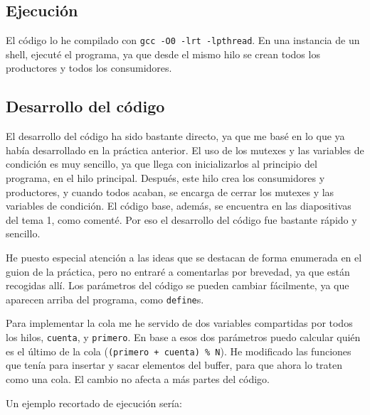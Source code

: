 \documentclass[a4paper]{article}
\begin{document}
\subsection{Ejecución}

El código lo he compilado con \texttt{gcc -O0 -lrt -lpthread}. En una instancia de un shell, ejecuté el programa, ya que desde el mismo hilo se crean todos los productores y todos los consumidores.

\subsection{Desarrollo del código}

El desarrollo del código ha sido bastante directo, ya que me basé en lo que ya había desarrollado en la práctica anterior. El uso de los mutexes y las variables de condición es muy sencillo, ya que llega con inicializarlos al principio del programa, en el hilo principal. Después, este hilo crea los consumidores y productores, y cuando todos acaban, se encarga de cerrar los mutexes y las variables de condición. El código base, además, se encuentra en las diapositivas del tema 1, como comenté. Por eso el desarrollo del código fue bastante rápido y sencillo.

He puesto especial atención a las ideas que se destacan de forma enumerada en el guion de la práctica, pero no entraré a comentarlas por brevedad, ya que están recogidas allí. Los parámetros del código se pueden cambiar fácilmente, ya que aparecen arriba del programa, como \texttt{define}s.

Para implementar la cola me he servido de dos variables compartidas por todos los hilos, \texttt{cuenta}, y \texttt{primero}. En base a esos dos parámetros puedo calcular quién es el último de la cola (\texttt{(primero + cuenta) \% N}). He modificado las funciones que tenía para insertar y sacar elementos del buffer, para que ahora lo traten como una cola. El cambio no afecta a más partes del código.

Un ejemplo recortado de ejecución sería:
\end{document}
